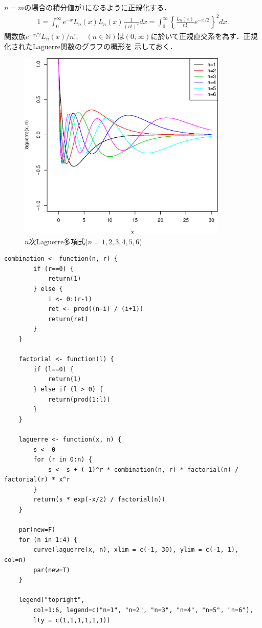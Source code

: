 \documentclass[a4j,papersize,disablejfam,slide,14pt]{jsarticle}
\def\exp#1{e^{#1}} %
\begin{document}
    $n=m$の場合の積分値が$1$になるように正規化する．
    \begin{align}
    	1 = \int_{0}^{\infty} \exp{-x} L_n(x)L_n(x) \frac{1}{(n!)^2} dx = \int_{0}^{\infty} \left\{ \frac{L_n(x)}{n!} \exp{-x/2} \right\}^2 dx.
    \end{align}
    関数族$ \exp{-x/2} L_n(x) / n!, \quad (n \in \mathbb{N})$は$(0, \infty)$に於いて正規直交系を為す．正規化された{\rm Laguerre}関数のグラフの概形を
    示しておく．
    \begin{figure}[H]
        \begin{center}
    	\includegraphics[clip,width = 10.0cm]{graphics/laguerre.eps}
        \end{center}
        \caption{$n$次{\rm Laguerre}多項式($n=1,2,3,4,5,6$)}
    \end{figure}
    \begin{lstlisting}[style=customR]
	combination <- function(n, r) {
	    if (r==0) {
	        return(1)
	    } else {
	        i <- 0:(r-1)
	        ret <- prod((n-i) / (i+1))
	        return(ret)
	    }
	}
	
	factorial <- function(l) {
	    if (l==0) {
	        return(1)
	    } else if (l > 0) {
	        return(prod(1:l))
	    }
	}
	
	laguerre <- function(x, n) {
	    s <- 0
	    for (r in 0:n) {
	        s <- s + (-1)^r * combination(n, r) * factorial(n) / factorial(r) * x^r
	    }
	    return(s * exp(-x/2) / factorial(n))
	}
	
	par(new=F)
	for (n in 1:4) {
	    curve(laguerre(x, n), xlim = c(-1, 30), ylim = c(-1, 1), col=n)
	    par(new=T)
	}
	
	legend("topright",
    	col=1:6, legend=c("n=1", "n=2", "n=3", "n=4", "n=5", "n=6"),
    	lty = c(1,1,1,1,1,1))
    \end{lstlisting}
    
\end{document}
